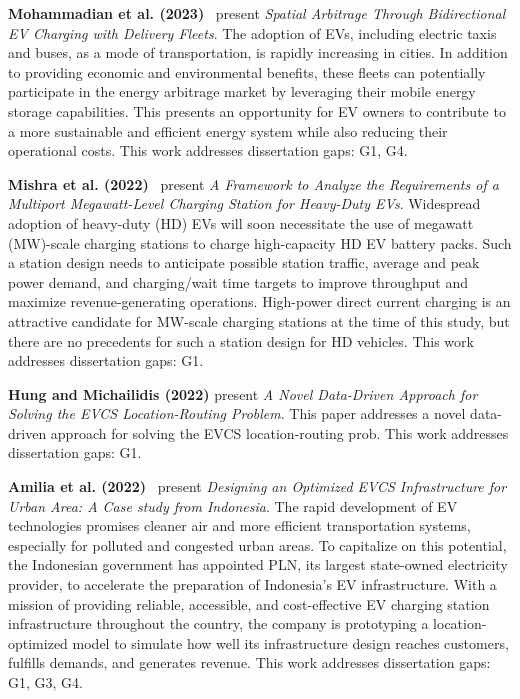 \documentclass[letterpaper, 12pt, oneside, doublespacing]{Thesis}
\begin{document}
\noindent \textbf{Mohammadian et al. (2023)}~\cite{spatial_arbitrage_2023} present \textit{Spatial Arbitrage Through Bidirectional EV Charging with Delivery Fleets}. The adoption of EVs, including electric taxis and buses, as a mode of transportation, is rapidly increasing in cities. In addition to providing economic and environmental benefits, these fleets can potentially participate in the energy arbitrage market by leveraging their mobile energy storage capabilities. This presents an opportunity for EV owners to contribute to a more sustainable and efficient energy system while also reducing their operational costs. This work addresses dissertation gaps: G1, G4.



\noindent \textbf{Mishra et al. (2022)}~\cite{a_framework_2022} present \textit{A Framework to Analyze the Requirements of a Multiport Megawatt-Level Charging Station for Heavy-Duty EVs}. Widespread adoption of heavy-duty (HD) EVs will soon necessitate the use of megawatt (MW)-scale charging stations to charge high-capacity HD EV battery packs. Such a station design needs to anticipate possible station traffic, average and peak power demand, and charging/wait time targets to improve throughput and maximize revenue-generating operations. High-power direct current charging is an attractive candidate for MW-scale charging stations at the time of this study, but there are no precedents for such a station design for HD vehicles. This work addresses dissertation gaps: G1.



\noindent \textbf{Hung and Michailidis (2022)} present \textit{A Novel Data-Driven Approach for Solving the EVCS Location-Routing Problem}. This paper addresses a novel data-driven approach for solving the EVCS location-routing prob. This work addresses dissertation gaps: G1.



\noindent \textbf{Amilia et al. (2022)}~\cite{designing_an_2022} present \textit{Designing an Optimized EVCS Infrastructure for Urban Area: A Case study from Indonesia}. The rapid development of EV technologies promises cleaner air and more efficient transportation systems, especially for polluted and congested urban areas. To capitalize on this potential, the Indonesian government has appointed PLN, its largest state-owned electricity provider, to accelerate the preparation of Indonesia's EV infrastructure. With a mission of providing reliable, accessible, and cost-effective EV charging station infrastructure throughout the country, the company is prototyping a location-optimized model to simulate how well its infrastructure design reaches customers, fulfills demands, and generates revenue. This work addresses dissertation gaps: G1, G3, G4.
\end{document}
